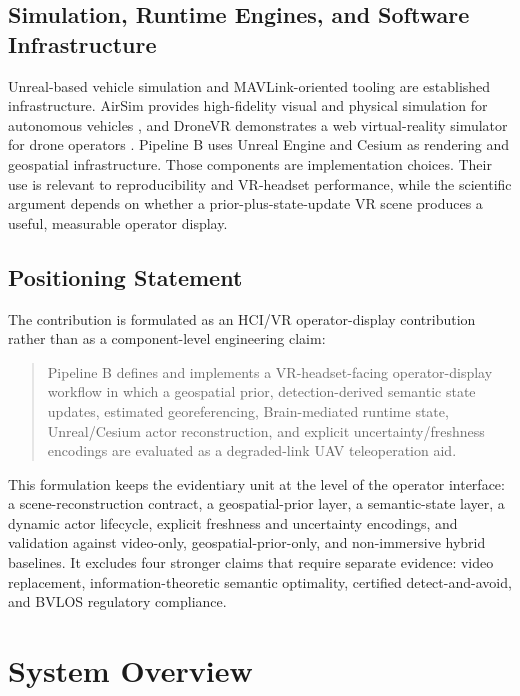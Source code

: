 \documentclass[fleqn]{VRIH2025}
\begin{document}
\subsection{Simulation, Runtime Engines, and Software Infrastructure}

Unreal-based vehicle simulation and MAVLink-oriented tooling are established infrastructure. AirSim provides high-fidelity visual and physical simulation for autonomous vehicles \cite{shah2017airsim}, and DroneVR demonstrates a web virtual-reality simulator for drone operators \cite{nguyen2019dronevr}. Pipeline B uses Unreal Engine and Cesium as rendering and geospatial infrastructure. Those components are implementation choices. Their use is relevant to reproducibility and VR-headset performance, while the scientific argument depends on whether a prior-plus-state-update VR scene produces a useful, measurable operator display.

\subsection{Positioning Statement}

The contribution is formulated as an HCI/VR operator-display contribution rather than as a component-level engineering claim:

\begin{quote}
Pipeline B defines and implements a VR-headset-facing operator-display workflow in which a geospatial prior, detection-derived semantic state updates, estimated georeferencing, Brain-mediated runtime state, Unreal/Cesium actor reconstruction, and explicit uncertainty/freshness encodings are evaluated as a degraded-link UAV teleoperation aid.
\end{quote}

This formulation keeps the evidentiary unit at the level of the operator interface: a scene-reconstruction contract, a geospatial-prior layer, a semantic-state layer, a dynamic actor lifecycle, explicit freshness and uncertainty encodings, and validation against video-only, geospatial-prior-only, and non-immersive hybrid baselines. It excludes four stronger claims that require separate evidence: video replacement, information-theoretic semantic optimality, certified detect-and-avoid, and BVLOS regulatory compliance.

\section{System Overview}
\end{document}
